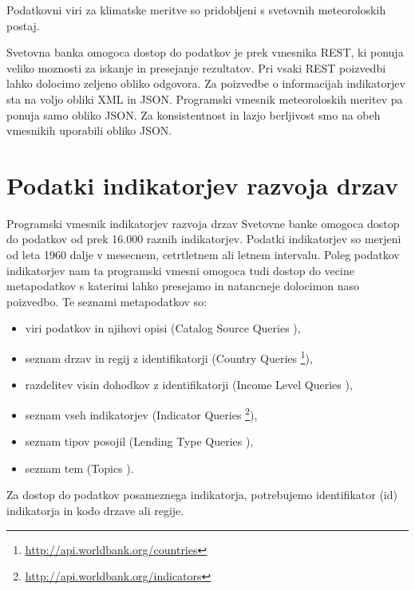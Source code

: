 Podatkovni viri za klimatske meritve so pridobljeni s svetovnih meteoroloskih 
postaj.


Svetovna banka omogoca dostop do podatkov je prek vmesnika REST, ki ponuja 
veliko moznosti za iskanje in presejanje rezultatov. Pri vsaki REST poizvedbi
lahko dolocimo zeljeno obliko odgovora. Za poizvedbe o informacijah 
indikatorjev sta na voljo obliki XML in JSON. Programski vmesnik meteoroloskih
meritev pa ponuja samo obliko JSON. Za konsistentnost in lazjo berljivost smo
na obeh vmesnikih uporabili obliko JSON. 



\section{Podatki indikatorjev razvoja drzav}



Programski vmesnik indikatorjev razvoja drzav Svetovne banke omogoca dostop
do podatkov od prek 16.000 raznih indikatorjev. Podatki indikatorjev so merjeni
od leta 1960 dalje v mesecnem, cetrtletnem ali letnem intervalu. Poleg podatkov
indikatorjev nam ta programski vmesni omogoca tudi dostop do vecine
metapodatkov s katerimi lahko presejamo in natancneje dolocimon naso poizvedbo.
Te seznami metapodatkov so:
\begin{itemize}
\item viri podatkov in njihovi opisi (Catalog Source Queries
	),
\item seznam drzav in regij z identifikatorji (Country Queries
	\footnote{\label{country_list} \url{http://api.worldbank.org/countries}}),
\item razdelitev visin dohodkov z identifikatorji (Income Level Queries
	),
\item seznam vseh indikatorjev (Indicator Queries
    \footnote{\label{indicators_list} 
		\url{http://api.worldbank.org/indicators}}),
\item seznam tipov posojil (Lending Type Queries
	),
\item seznam tem (Topics ).
\end{itemize}


Za dostop do podatkov posameznega indikatorja, potrebujemo identifikator (id)
indikatorja in kodo drzave ali regije. 


